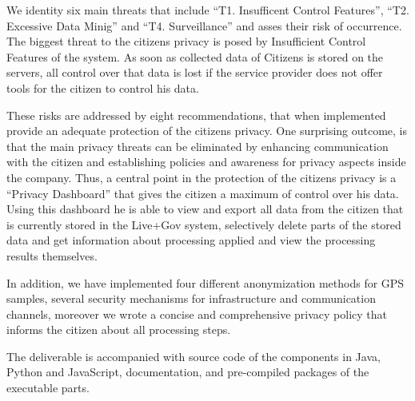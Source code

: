\documentclass[external]{20120615_deliverable_template_ukob}
\theoremstyle{definition}
\begin{document}
\begin{LGExecutiveSummary}
We identity six main threats that include ``T1. Insufficent Control
Features'', ``T2. Excessive Data Minig'' and ``T4. Surveillance'' and
asses their risk of occurrence. The biggest threat to the citizens
privacy is posed by Insufficient Control Features of the system. As
soon as collected data of Citizens is stored on the servers, all
control over that data is lost if the service provider does not offer
tools for the citizen to control his data.

These risks are addressed by eight recommendations, that when
implemented provide an adequate protection of the citizens privacy.
One surprising outcome, is that the main privacy threats can be
eliminated by enhancing communication with the citizen and
establishing policies and awareness for privacy aspects inside the
company. Thus, a central point in the protection of the citizens privacy is
a ``Privacy Dashboard'' that gives the citizen a maximum of control
over his data. Using this dashboard he is able to view and export all
data from the citizen that is currently stored in the Live+Gov system,
selectively delete parts of the stored data and get information about
processing applied and view the processing results themselves.

In addition, we have implemented four different anonymization methods
for GPS samples, several security mechanisms for infrastructure and
communication channels, moreover we wrote a concise and comprehensive
privacy policy that informs the citizen about all processing steps.

The deliverable is accompanied with source code of the components in
Java, Python and JavaScript, documentation, and pre-compiled packages
of the executable parts.

\end{LGExecutiveSummary}
\end{document}
